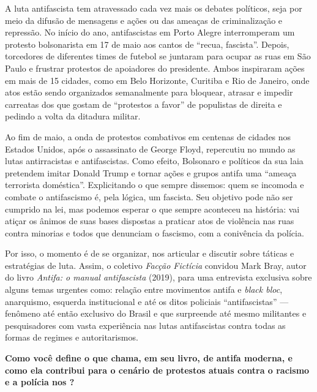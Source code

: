 

A luta antifascista tem atravessado cada vez mais os debates políticos, seja por meio da difusão de mensagens e ações ou das ameaças de criminalização e repressão. No início do ano, antifascistas em Porto Alegre interromperam um protesto bolsonarista em 17 de maio aos cantos de ``recua, fascista''. Depois, torcedores de diferentes times de futebol se juntaram para ocupar as ruas em São Paulo e frustrar protestos de apoiadores do presidente. Ambos inspiraram ações em mais de 15 cidades, como em Belo Horizonte, Curitiba e Rio de Janeiro, onde atos estão sendo organizados semanalmente para bloquear, atrasar e impedir carreatas dos que gostam de ``protestos a favor'' de populistas de direita e pedindo a volta da ditadura militar.
 
Ao fim de maio, a onda de protestos combativos em centenas de cidades nos Estados Unidos, após o assassinato de George Floyd, repercutiu no mundo as lutas antirracistas e antifascistas. Como efeito, Bolsonaro e políticos da sua laia pretendem imitar Donald Trump e tornar ações e grupos antifa uma ``ameaça terrorista doméstica''. Explicitando o que sempre dissemos: quem se incomoda e combate o antifascismo é, pela lógica, um fascista. Seu objetivo pode não ser cumprido na lei, mas podemos esperar o que sempre aconteceu na história: vai atiçar os ânimos de suas bases dispostas a praticar atos de violência nas ruas contra minorias e todos que denunciam o fascismo, com a conivência da polícia.
 
Por isso, o momento é de se organizar, nos articular e discutir sobre táticas e estratégias de luta. Assim, o coletivo \emph{Facção Fictícia} convidou Mark Bray, autor do livro \emph{Antifa: o manual antifascista} (2019), para uma entrevista exclusiva sobre alguns temas urgentes como: relação entre movimentos antifa e \emph{black bloc}, anarquismo, esquerda institucional e até os ditos policiais ``antifascistas'' --- fenômeno até então exclusivo do Brasil e que surpreende até mesmo militantes e pesquisadores com vasta experiência nas lutas antifascistas contra todas as formas de regimes e autoritarismos.

\bigskip

\noindent{}\textbf{Como você define o que chama, em seu livro, de antifa moderna, e como ela contribui para o cenário de protestos atuais contra o racismo e a polícia nos ?}

